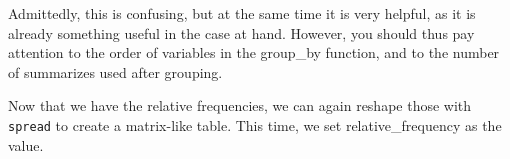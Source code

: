 \documentclass[]{tufte-book}
\newenvironment{Shaded}{}{}
\newcommand{\DataTypeTok}[1]{\textcolor[rgb]{0.56,0.13,0.00}{#1}}
\newcommand{\DecValTok}[1]{\textcolor[rgb]{0.25,0.63,0.44}{#1}}
\newcommand{\KeywordTok}[1]{\textcolor[rgb]{0.00,0.44,0.13}{\textbf{#1}}}
\newcommand{\NormalTok}[1]{#1}
\newcommand{\OperatorTok}[1]{\textcolor[rgb]{0.40,0.40,0.40}{#1}}
\newcommand{\StringTok}[1]{\textcolor[rgb]{0.25,0.44,0.63}{#1}}
\begin{document}
Admittedly, this is confusing, but at the same time it is very helpful, as it is already something useful in the case at hand. However, you should thus pay attention to the order of variables in the group\_by function, and to the number of summarizes used after grouping.

Now that we have the relative frequencies, we can again reshape those with \texttt{spread} to create a matrix-like table. This time, we set relative\_frequency as the value.

\begin{Shaded}
\end{Shaded}
\end{document}
